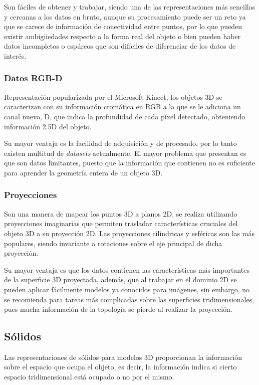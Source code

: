Son fáciles de obtener y trabajar, siendo una de las representaciones más sencillas y cercanas a los datos en bruto, aunque su procesamiento puede ser un reto ya que se carece de información de conectividad entre puntos, por lo que pueden existir ambigüedades respecto a la forma real del objeto o bien pueden haber datos incompletos o espúreos que son difíciles de diferenciar de los datos de interés.

\subsubsection{Datos RGB-D}
Representación popularizada por el Microsoft Kinect, los objetos 3D se caracterizan con su información cromática en RGB a la que se le adiciona un canal nuevo, D, que indica la profundidad de cada píxel detectado, obteniendo información 2.5D del objeto.

Su mayor ventaja es la facilidad de adquisición y de procesado, por lo tanto existen multitud de \textit{datasets} actualmente. El mayor problema que presentan es que son datos limitantes, puesto que la información que contienen no es suficiente para aprender la geometría entera de un objeto 3D.

\subsubsection{Proyecciones}
Son una manera de mapear los puntos 3D a planos 2D, se realiza utilizando proyecciones imaginarias que permiten trasladar características cruciales del objeto 3D a su proyección 2D. Las proyecciones cilíndricas y esféricas son las más populares, siendo invariante a rotaciones sobre el eje principal de dicha proyección.

Su mayor ventaja es que los datos contienen las características más importantes de la superficie 3D proyectada, además, que al trabajar en el dominio 2D se pueden aplicar fácilmente modelos ya conocidos para imágenes, sin embargo, no se recomienda para tareas más complicadas sobre las superficies tridimensionales, pues mucha información de la topología se pierde al realizar la proyección.

\subsection{Sólidos}
Las representaciones de sólidos para modelos 3D proporcionan la información sobre el espacio que ocupa el objeto, es decir, la información indica si cierto espacio tridimensional está ocupado o no por el mismo.

